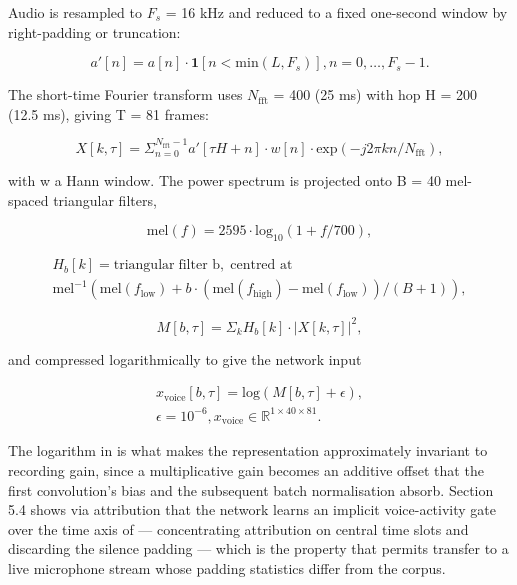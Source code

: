 Audio is resampled to $F_{s}$ = 16 kHz and reduced to a fixed one-second window by right-padding or truncation:

\begin{equation}
\label{eq:27}
a'[n] = a[n] \cdot \mathbf{1}[ n < \mathrm{min}(L, F_s) ] , n = 0, \dots , F_s - 1.
\end{equation}

The short-time Fourier transform  uses $N_{\mathrm{fft}}$ = 400 (25 ms) with hop H = 200 (12.5 ms), giving T = 81 frames:

\begin{equation}
\label{eq:28}
X[k, \tau ] = \Sigma _{n=0}^{N_{\mathrm{fft}} - 1} a'[ \tau H + n ] \cdot w[n] \cdot \mathrm{exp}( -j 2\pi k n / N_{\mathrm{fft}} ),
\end{equation}

with w a Hann window. The power spectrum is projected onto B = 40 mel-spaced triangular filters,

\begin{equation}
\label{eq:29}
\mathrm{mel}(f) = 2595 \cdot \mathrm{log}_{10}( 1 + f/700 ),
\end{equation}

\begin{equation}
\label{eq:30}
\begin{aligned}
H_b[k] = \mathrm{triangular} \;\text{filter b}, \;\text{centred at} \\ 
\mathrm{mel}^{-1}( \mathrm{mel}(f_{\mathrm{low}}) + b \cdot ( \mathrm{mel}(f_{\mathrm{high}}) - \mathrm{mel}(f_{\mathrm{low}}) ) / (B+1) ),
\end{aligned}
\end{equation}

\begin{equation}
\label{eq:31}
M[b, \tau ] = \Sigma _{k} H_b[k] \cdot | X[k, \tau ] |^{2} ,
\end{equation}

and compressed logarithmically to give the network input

\begin{equation}
\label{eq:32}
\begin{aligned}
x_{\mathrm{voice}}[b, \tau ] = \mathrm{log}( M[b, \tau ] + \epsilon ) , \\
\epsilon = 10^{-6} , x_{\mathrm{voice}} \in \mathbb{R}^{1 \times 40 \times 81}.
\end{aligned}
\end{equation}

The logarithm in  is what makes the representation approximately invariant to recording gain, since a multiplicative gain becomes an additive offset that the first convolution's bias and the subsequent batch normalisation absorb. Section 5.4 shows via attribution that the network learns an implicit voice-activity gate over the time axis of  --- concentrating attribution on central time slots and discarding the silence padding --- which is the property that permits transfer to a live microphone stream whose padding statistics differ from the corpus.

